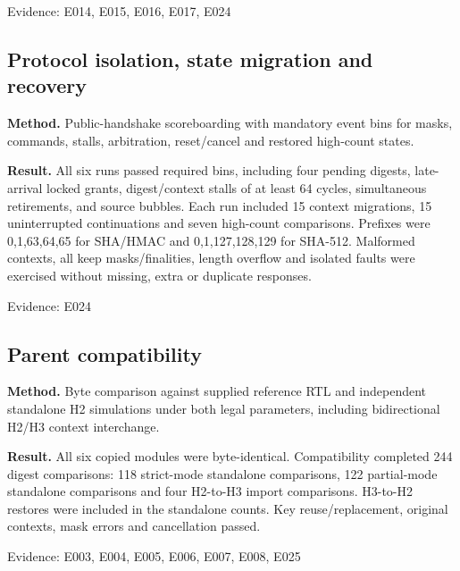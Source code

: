 \documentclass[11pt,a4paper]{article}
\begin{document}
{\small Evidence: E014,\allowbreak{} E015,\allowbreak{} E016,\allowbreak{} E017,\allowbreak{} E024}

\subsection{Protocol isolation,\allowbreak{} state migration and recovery}

\textbf{Method.} Public-handshake scoreboarding with mandatory event bins for masks,\allowbreak{} commands,\allowbreak{} stalls,\allowbreak{} arbitration,\allowbreak{} reset/\allowbreak{}cancel and restored high-count states.

\textbf{Result.} All six runs passed required bins,\allowbreak{} including four pending digests,\allowbreak{} late-arrival locked grants,\allowbreak{} digest/\allowbreak{}context stalls of at least 64 cycles,\allowbreak{} simultaneous retirements,\allowbreak{} and source bubbles. Each run included 15 context migrations,\allowbreak{} 15 uninterrupted continuations and seven high-count comparisons. Prefixes were 0,\allowbreak{}1,\allowbreak{}63,\allowbreak{}64,\allowbreak{}65 for SHA/\allowbreak{}HMAC and 0,\allowbreak{}1,\allowbreak{}127,\allowbreak{}128,\allowbreak{}129 for SHA-512. Malformed contexts,\allowbreak{} all keep masks/\allowbreak{}finalities,\allowbreak{} length overflow and isolated faults were exercised without missing,\allowbreak{} extra or duplicate responses.

{\small Evidence: E024}

\subsection{Parent compatibility}

\textbf{Method.} Byte comparison against supplied reference RTL and independent standalone H2 simulations under both legal parameters,\allowbreak{} including bidirectional H2/\allowbreak{}H3 context interchange.

\textbf{Result.} All six copied modules were byte-identical. Compatibility completed 244 digest comparisons: 118 strict-mode standalone comparisons,\allowbreak{} 122 partial-mode standalone comparisons and four H2-to-H3 import comparisons. H3-to-H2 restores were included in the standalone counts. Key reuse/\allowbreak{}replacement,\allowbreak{} original contexts,\allowbreak{} mask errors and cancellation passed.

{\small Evidence: E003,\allowbreak{} E004,\allowbreak{} E005,\allowbreak{} E006,\allowbreak{} E007,\allowbreak{} E008,\allowbreak{} E025}
\end{document}
